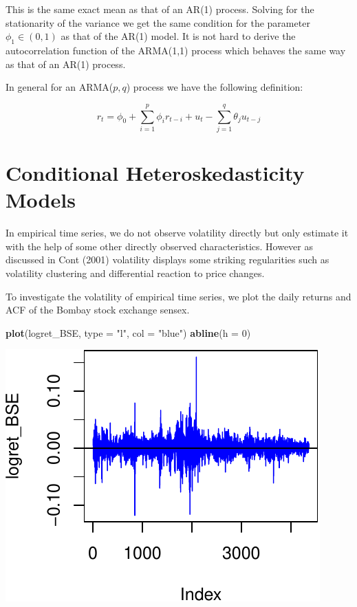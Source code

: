 \documentclass[11pt,]{article}
\newenvironment{Shaded}{\begin{snugshade}}{\end{snugshade}}
\newcommand{\KeywordTok}[1]{\textcolor[rgb]{0.13,0.29,0.53}{\textbf{#1}}}
\newcommand{\DataTypeTok}[1]{\textcolor[rgb]{0.13,0.29,0.53}{#1}}
\newcommand{\DecValTok}[1]{\textcolor[rgb]{0.00,0.00,0.81}{#1}}
\newcommand{\StringTok}[1]{\textcolor[rgb]{0.31,0.60,0.02}{#1}}
\newcommand{\NormalTok}[1]{#1}
\begin{document}
This is the same exact mean as that of an AR(1) process. Solving for the
stationarity of the variance we get the same condition for the parameter
\(\phi_1\in (0,1)\) as that of the AR(1) model. It is not hard to derive
the autocorrelation function of the ARMA(1,1) process which behaves the
same way as that of an AR(1) process.

In general for an ARMA(\(p, q\)) process we have the following
definition:

\[r_t = \phi_0 + \sum_{i=1}^p \phi_ir_{t-i}+u_t-\sum_{j=1}^q \theta_ju_{t-j}\]

\section{Conditional Heteroskedasticity
Models}\label{conditional-heteroskedasticity-models}

In empirical time series, we do not observe volatility directly but only
estimate it with the help of some other directly observed
characteristics. However as discussed in Cont (2001) volatility displays
some striking regularities such as volatility clustering and
differential reaction to price changes.

To investigate the volatility of empirical time series, we plot the
daily returns and ACF of the Bombay stock exchange sensex.

\begin{Shaded}
\begin{Highlighting}[]
\KeywordTok{plot}\NormalTok{(logret_BSE, }\DataTypeTok{type =} \StringTok{"l"}\NormalTok{, }\DataTypeTok{col =} \StringTok{"blue"}\NormalTok{)}
\KeywordTok{abline}\NormalTok{(}\DataTypeTok{h =} \DecValTok{0}\NormalTok{)}
\end{Highlighting}
\end{Shaded}

\begin{center}\includegraphics{FMC_T4_PhD_ARMA_GARCH_files/figure-latex/BSE_ret_ACF-1} \end{center}
\end{document}

